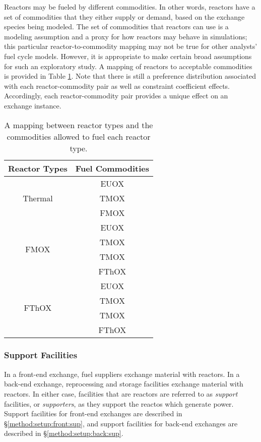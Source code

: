 Reactors may be fueled by different commodities. In other words, reactors have a
set of commodities that they either supply or demand, based on the exchange
species being modeled. The set of commodities that reactors can use is a
modeling assumption and a proxy for how reactors may behave in simulations; this
particular reactor-to-commodity mapping may not be true for other analysts' fuel
cycle models. However, it is appropriate to make certain broad assumptions for
such an exploratory study. A mapping of reactors to acceptable commodities is
provided in Table \ref{tbl:rx_to_commods}. Note that there is still a
preference distribution associated with each reactor-commodity pair as well as
constraint coefficient effects. Accordingly, each reactor-commodity pair
provides a unique effect on an exchange instance.

\begin{table}[h]
\centering
\caption{A mapping between reactor types and the commodities allowed to fuel each reactor type.}
\label{tbl:rx_to_commods}
\begin{tabular}{|c|c|}
\hline
Reactor Types            & Fuel Commodities \\ \hline
\multirow{3}{*}{Thermal}                    & EUOX         \\ 
                      & TMOX        \\  
                      & FMOX       \\ \hline
\multirow{4}{*}{FMOX}  & EUOX         \\  
                      & TMOX        \\ 
                      & TMOX        \\  
                      & FThOX        \\ \hline 
\multirow{4}{*}{FThOX} & EUOX         \\  
                     & TMOX        \\ 
                      & TMOX        \\  
                      & FThOX        \\ \hline 
\end{tabular}
\end{table}

\subsubsection{Support Facilities}

In a front-end exchange, fuel suppliers exchange material with reactors. In a
back-end exchange, reprocessing and storage facilities exchange material with
reactors. In either case, facilities that are  reactors are referred
to as \textit{support} facilities, or \textit{supporters}, as they support the
reactos which generate power. Support facilities for front-end exchanges are
described in \S \ref{method:setup:front:sup}, and support facilities for
back-end exchanges are described in \S \ref{method:setup:back:sup}.

